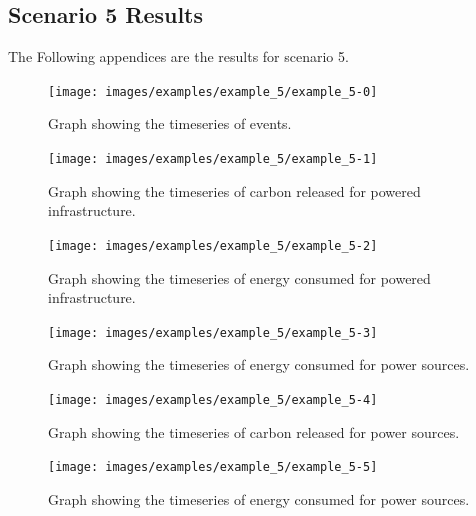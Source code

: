 \documentclass{l4proj}
\begin{document}
\begin{appendices}
\section{Scenario 5 Results}\label{apen:subsec:scen5}
The Following appendices are the results for scenario 5.
\clearpage
\begin{figure}[htbp]
    \centering
    \texttt{[image: images/examples/example\_5/example\_5-0]}
    ~
    \caption{Graph showing the timeseries of events.}
    \label{fig:example5-0}
\end{figure}
\clearpage
\begin{figure}[htbp]
    \centering
    \texttt{[image: images/examples/example\_5/example\_5-1]}
    ~
    \caption{Graph showing the timeseries of carbon released for powered infrastructure.}
    \label{fig:example5-1}
\end{figure}
\clearpage
\begin{figure}[htbp]
    \centering
    \texttt{[image: images/examples/example\_5/example\_5-2]}
    ~
    \caption{Graph showing the timeseries of energy consumed for powered infrastructure.}
    \label{fig:example5-2}
\end{figure}
\clearpage
\begin{figure}[htbp]
    \centering
    \texttt{[image: images/examples/example\_5/example\_5-3]}
    ~
    \caption{Graph showing the timeseries of energy consumed for power sources.}
    \label{fig:example5-3}
\end{figure}
\clearpage
\begin{figure}[htbp]
    \centering
    \texttt{[image: images/examples/example\_5/example\_5-4]}
    ~
    \caption{Graph showing the timeseries of carbon released for power sources.}
    \label{fig:example5-4}
\end{figure}
\clearpage
\begin{figure}[htbp]
    \centering
    \texttt{[image: images/examples/example\_5/example\_5-5]}
    ~
    \caption{Graph showing the timeseries of energy consumed for power sources.}
    \label{fig:example5-5}
\end{figure}

\clearpage

\end{appendices}
\end{document}
